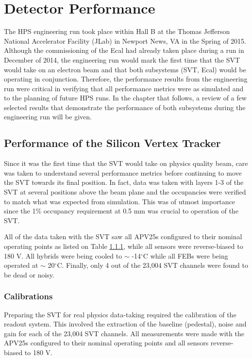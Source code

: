 
\chapter{Detector Performance}

The HPS engineering run took place within Hall B at the Thomas Jefferson 
National Accelerator Facility (JLab) in Newport News, VA in the Spring of 2015.
Although the commissioning of the Ecal had already taken place during a run in 
December of 2014, the engineering run would mark the first time that the SVT 
would take on an electron beam and that both subsystems (SVT, Ecal) would be operating in 
conjunction.  Therefore, the performance results from the engineering run were
critical in verifying that all performance metrics were as simulated and to the
planning of future HPS runs.  In the chapter that follows, a review of a few
selected results that demonstrate the performance of both subsystems during the
engineering run will be given.

\section{Performance of the Silicon Vertex Tracker}

Since it was the first time that the SVT would take on physics quality beam, 
care was taken to understand several performance metrics before continuing to
move the SVT towards its final position. 
In fact, data was taken with layers 1-3 of the SVT at several positions above the
beam plane and the occupancies were verified
to match what was expected from simulation.  This was of utmost  
importance since the 1\% occupancy requirement at 0.5 mm was crucial to operation of the
SVT. 

All of the data taken with the SVT saw all APV25s configured to their nominal
operating points as listed on Table \ref{}, while all sensors were reverse-biased
to 180 V. All hybrids were being cooled to $\sim$ -14$^{\circ}$C while all FEBs
were being operated at $\sim$ 20$^{\circ}$C.  Finally, only 4 out of the 23,004
SVT channels were found to be dead or noisy.

\subsection{Calibrations}

Preparing the SVT for real physics data-taking required the calibration of the
readout system. This involved the extraction of the baseline 
(pedestal), noise and gain for each of the 23,004 SVT channels.  All 
measurements were made with the APV25s configured to their nominal operating
points and all sensors reverse-biased to 180 V.

